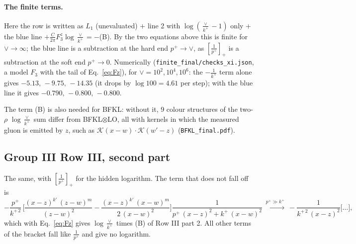 \paragraph{The finite terms.} Here the row is written as $L_1$ (unevaluated) $+$ line 2 with $\log(\frac{\vee}{k^+}-1)$ only $+$ the blue line $+\frac{C}{2\pi}F_3^z\log\frac{\vee}{k^+}=-$(B). By the two equations above this is finite for $\vee\to\infty$; the blue line is a subtraction at the hard end $p^+\to\vee$, as $\left[\frac{1}{p^+}\right]_+$ is a subtraction at the soft end $p^+\to0$. Numerically (\texttt{finite\_final/checks\_xi.json}, a model $F_3$ with the tail of Eq.~\eqref{eq:Fz}), for $\vee=10^2,10^4,10^6$: the $-\frac{1}{k^+}$ term alone gives $-5.13,\,-9.75,\,-14.35$ (it drops by $\log100=4.61$ per step); with the blue line it gives $-0.790,\,-0.800,\,-0.800$.

The term (B) is also needed for BFKL: without it, 9 colour structures of the two-$\rho$ $\log\frac{\vee}{k^+}$ sum differ from BFKL$\otimes$LO, all with kernels in which the measured gluon is emitted by $z$, such as $\mathcal K(x-w)\cdot\mathcal K(w'-z)$ (\texttt{BFKL\_final.pdf}).

\subsection{Group III Row III, second part}
The same, with $\left[\frac{1}{p^+}\right]_+$ for the hidden logarithm. The term that does not fall off is
\begin{equation*}
-\frac{p^{+}}{k^{+\,2}}\,\bigg[\frac{(x-z)^{k'}\,(z-w)^{m}}{(z-w)^{2}} -\frac{(x-z)^{k'}\,(x-w)^{m}}{2\,(x-w)^{2}}\bigg]\frac{1}{p^{+}\,(x-z)^{2}+k^{+}\,(x-w)^{2}}\ \xrightarrow{p^+\gg k^+}\ -\frac{1}{k^{+\,2}\,(x-z)^{2}}\bigg[\dots\bigg],
\end{equation*}
which with Eq.~\eqref{eq:Fz} gives $\log\frac{\vee}{k^+}$ times (B) of Row III part 2. All other terms of the bracket fall like $\frac{1}{p^+}$ and give no logarithm.

